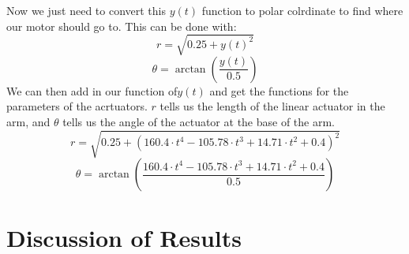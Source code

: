 \documentclass[nofoot,pdf-a,balance,colorlinks,upint,subscriptcorrection,varvw,mathalfa=cal=boondoxo]{asmeconf}
\begin{document}
	Now we just need to convert this $y\left(t\right)$ function to polar colrdinate to find where our motor should go to. This can be done with:
	\begin{equation}
	r = \sqrt{0.25+y\left(t\right)^2}
	\end{equation}
	\begin{equation}
	\theta = \arctan(\frac{y\left(t\right)}{0.5})
	\end{equation}
	We can then add in our function of$y\left(t\right)$ and get the functions for the parameters of the acrtuators. $r$ tells us the length of the linear actuator in the arm, and $\theta$ tells us the angle of the actuator at the base of the arm. 
	\begin{equation}
	r = \sqrt{0.25+\left( 160.4 \cdot t^4 - 105.78 \cdot t^3 + 14.71 \cdot t^2 + 0.4\right)^2}
	\end{equation}
	\begin{equation}
	\theta = \arctan(\frac{160.4 \cdot t^4 - 105.78 \cdot t^3 + 14.71 \cdot t^2 + 0.4}{0.5})
	\end{equation}

	\section*{Discussion of Results}

	
\end{document}
